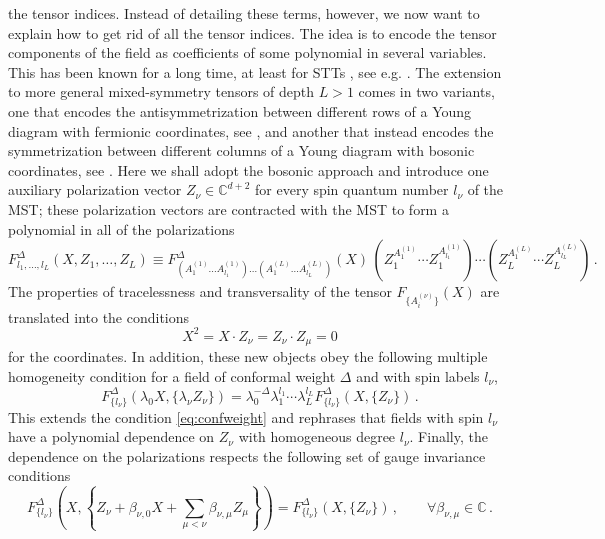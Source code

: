 \documentclass{article}
\begin{document}
the tensor indices. Instead of detailing these terms, however, we now want to explain 
how to get rid of all the tensor indices. The idea is to encode the 
tensor components of the field as coefficients of some polynomial in several 
variables. This has been known for a long time, at least for STTs , see e.g. 
\cite{Bargmann_1977,Dobrev:1977qv}. The extension to more general mixed-symmetry 
tensors of depth $L > 1$ comes in two variants, one that encodes the 
antisymmetrization between different rows of a Young diagram with fermionic coordinates, see \cite{Costa_2015}, and another that instead encodes the 
symmetrization between different columns of a Young diagram with bosonic coordinates, see \cite{Lauria:2018klo}. 
Here we shall adopt the bosonic approach and introduce one auxiliary polarization 
vector $Z_\nu\in \mathbb{C}^{d+2}$ for every spin quantum number $l_\nu$ of the 
MST; these polarization vectors are contracted with the MST to form a polynomial 
in all of the polarizations
\begin{equation}
    F^{\Delta}_{l_1,\dots,l_L}\left(X,Z_1,\dots,Z_L\right)\equiv 
    F^{\Delta}_{\left(A^{(1)}_1 \dots A^{(1)}_{l_1}\right)\dots \left(A^{(L)}_1\dots A^{(L)}_{l_L}\right)}(X)\,\left(Z_1^{A_1^{(1)}}\cdots 
    Z_1^{A_{l_1}^{(1)}}\right)\cdots \left(Z_L^{A_1^{(L)}}\cdots 
    Z_L^{A_{l_L}^{(L)}}\right)\,.
\end{equation}
The properties of  tracelessness and transversality of 
the tensor $F_{\{A_i^{(\nu)}\}}(X)$ are translated into the conditions 
\begin{equation} \label{eq:XXXZZZ}
    X^2=X\cdot Z_\nu=Z_\nu \cdot Z_\mu=0
\end{equation}
for the coordinates. In addition, these new objects obey the following 
multiple homogeneity condition for a field of conformal weight $\Delta$ and 
with spin labels $l_\nu$, 
\begin{equation}
    F^{\Delta}_{\{l_\nu\}}\!\left(\lambda_0 X, \{ \lambda_\nu
    Z_{\nu}\}\right)=\lambda_0^{-\Delta}\lambda_1^{l_1}\cdots \lambda_L^{l_L}
    F^\Delta_{\{l_\nu\}}(X,\{Z_\nu\})\,.
    \label{homogeneityconditions}
\end{equation}
This extends the condition \eqref{eq:confweight} and rephrases that fields 
with spin $l_\nu$ have a polynomial dependence on $Z_\nu$ with homogeneous 
degree $l_\nu$. Finally, the dependence on the polarizations respects
the following set of gauge invariance conditions
\begin{equation}
    F^\Delta_{\{l_\nu\}}\!\left(X,\left\{Z_\nu+\beta_{\nu,0} X +\sum_{\mu<\nu} 
    \beta_{\nu,\mu} Z_\mu\right\}\right)=F^\Delta_{\{l_\nu\}}(X,\{Z_\nu\})\,, \qquad 
    \forall \beta_{\nu,\mu}\in \mathbb{C}\,.
    \label{gaugeinvariance}
\end{equation}
\end{document}
